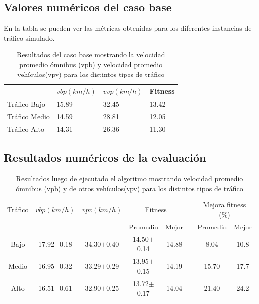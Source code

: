 \subsection{Valores numéricos del caso base}

En la tabla se pueden ver las métricas obtenidas para los diferentes instancias de tráfico simulado.
 
 \begin{table}[h]
 	\renewcommand{\arraystretch}{1.2}
 	\caption{Resultados del caso base mostrando la velocidad promedio ómnibus (vpb) y velocidad promedio vehículos(vpv) para los distintos tipos de tráfico}
 	\label{table:resultado_caso_base}
 	\centering
 	\begin{tabular}{p{2.5cm}p{2.5cm}p{2.5cm}p{2cm} }
 		\hline
 		&
 		$vbp(km/h)$& 
 		$vvp(km/h)$ & 
 		Fitness \\ 
 		\hline
 		Tráfico Bajo & 15.89  & 32.45& 13.42\\
 		Tráfico Medio & 14.59  & 28.81& 12.05\\
 		Tráfico Alto & 14.31  & 26.36& 11.30\\

 		\hline
 	\end{tabular}
 \end{table}


\subsection{Resultados numéricos de la evaluación }


\begin{table}[h]
	\renewcommand{\arraystretch}{1.2}	
		\centering
	\caption{Resultados luego de ejecutado el algoritmo mostrando velocidad promedio ómnibus (vpb) y  de otros vehículos(vpv) para los distintos tipos de tráfico }
	\label{table:resultado_caso_algoritmo}
	\begin{tabular}{cccccccc}
		\hline 
		Tráfico& 
		$vbp(km/h)$& 
		$vpv(km/h)$&
		\multicolumn{2}{c}{Fitness}&  & 
		\multicolumn{2}{c}{Mejora fitness (\%)}\\  \cline{4-5} \cline{7-8}&     &     & \multicolumn{1}{c}{Promedio} & \multicolumn{1}{c}{Mejor} &  & \multicolumn{1}{c}{Promedio} & \multicolumn{1}{c}{Mejor} \\ \hline
		Bajo & 17.92$\pm$0.18 & 34.30$\pm$0.40 & 14.50$\pm$0.14 & 14.88 & & 8.04 & 10.8  \\
		Medio& 16.95$\pm$0.32 & 33.29$\pm$0.29 & 13.95$\pm$0.15 & 14.19 & & 15.70& 17.7\\ 
		Alto & 16.51$\pm$0.61  & 32.90$\pm$0.25& 13.72$\pm$0.17 & 14.04 & & 21.40& 24.2\\		    
	\end{tabular}
\end{table}

